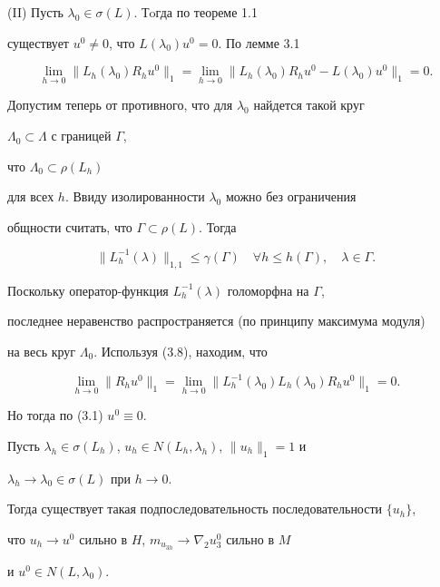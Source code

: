 (II) Пусть $\lambda_0 \in \sigma(L)$. Тoгда по теореме 1.1


существует $u^0\neq 0$, что $L(\lambda_0)u^0=0$. По лемме 3.1


\begin{equation}


\lim_{h\to 0}\|L_h(\lambda_0)R_h u^0\|_1=


\lim_{h\to 0}\|L_h(\lambda_0)R_h u^0-L(\lambda_0)u^0\|_1=0.


\end{equation}





Допустим теперь от противного, что для $\lambda_0$ найдется такой круг


$\Lambda_0\subset \Lambda$ с границей $\Gamma$,


что $\Lambda_0 \subset \rho(L_h)$


для всех $h$. Ввиду изолированности $\lambda_0$ можно без ограничения


общности считать, что $\Gamma\subset \rho(L)$. Тогда


$$


\|L_h^{-1}(\lambda)\|_{1,1}\le \gamma(\Gamma)


\quad \forall h\le h(\Gamma),\quad


\lambda \in \Gamma.


$$


Поскольку оператор-функция $L_h^{-1}(\lambda)$ голоморфна на $\Gamma$,


последнее неравенство распространяется (по принципу максимума модуля)


на весь круг $\Lambda_0$. Используя (3.8), находим, что


$$


\lim_{h\to 0}\|R_h u^0\|_1=


\lim_{h\to 0}\|L_h^{-1}(\lambda_0)L_h(\lambda_0)R_h u^0\|_1=0.


$$


Но тогда по (3.1)\; $u^0\equiv 0$.





\begin{thms} Пусть $\lambda_h\! \in\! \sigma(L_h)$, $u_h\!\in\!


N(L_h,\lambda_h)$, $\|u_h\|_1\!=\!1$ и


$\lambda_h \to \lambda_0\in \sigma(L)$ при $h \to 0$.


Тогда существует такая подпоследовательность последовательности $\{u_h\}$,


что $u_h\to u^0$ сильно в $H$, $m_{u_{3h}} \to \nabla_2 u_3^0$ сильно в $M$


и $u^0\in N(L,\lambda_0).$


\end{thms}





